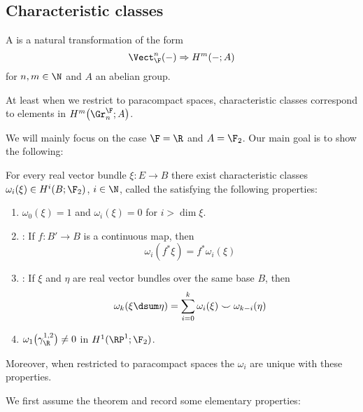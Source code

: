 \subsection{Characteristic classes}
\begin{definition}
	A  is a natural transformation of the form
	\begin{equation*}
		\Vect_{\F}^n({{-}}) \Rightarrow H^m({{-}}; A)
	\end{equation*}
	for $n, m \in \N$ and $A$ an abelian group.
\end{definition}
\begin{remark}
	At least when we restrict to paracompact spaces, characteristic classes correspond to elements in $H^m\big(\Gr^{\F}_n; A\big)$.
\end{remark}
We will mainly focus on the case $\F = \R$ and $A = \F_2$.
Our main goal is to show the following:
\begin{theorem}
	For every real vector bundle $\xi\colon E \to B$ there exist characteristic classes $\omega_i(\xi) \in H^i(B; \F_2)$, $i \in \N$, called the  satisfying the following properties:
	\begin{enumerate}
		\item $\omega_0(\xi) = 1$ and $\omega_i(\xi) = 0$ for $i > \dim \xi$.
		\item {}:
			If $f\colon B' \to B$ is a continuous map, then
			\begin{equation*}
				\omega_i(f^* \xi) = f^* \omega_i(\xi)
			\end{equation*}
		\item {}:
			If $\xi$ and $\eta$ are real vector bundles over the same base $B$, then
			\begin{equation*}
				\omega_k(\xi \dsum \eta) = \sum_{i = 0}^k \omega_i(\xi) \smile \omega_{k - i}(\eta)
			\end{equation*}
		\item\label{ax:stiefwhitnormalization} $\omega_1\big(\gamma_{\R}^{1, 2}\big) \neq 0$ in $H^1(\RP^1; \F_2)$.
	\end{enumerate}
	Moreover, when restricted to paracompact spaces the $\omega_i$ are unique with these properties.
\end{theorem}
We first assume the theorem and record some elementary properties:
